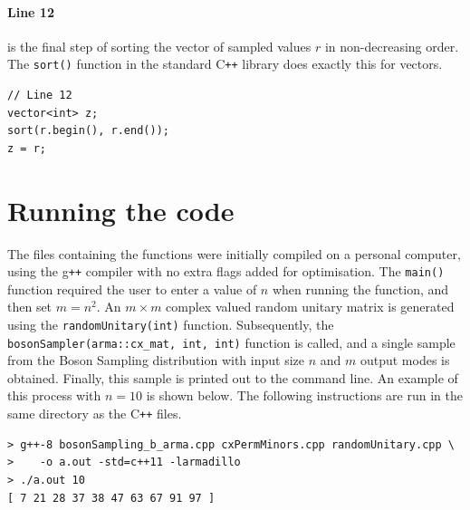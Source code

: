 \documentclass[ %
                    author={Manan Vaswani},
                supervisor={Dr. Raphael Clifford},
                    degree={MEng},
                     title={A multi-core CPU implementation of the classical Boson Sampling algorithm},
                  subtitle={},
                      type={},
                      year={2019} ]{dissertation}
\theoremstyle{plain}
\theoremstyle{definition}
\begin{document}
\paragraph{Line 12} is the final step of sorting the vector of sampled values $r$ in non-decreasing order. The \texttt{sort()} function in the standard C\texttt{++} library does exactly this for vectors.
\begin{verbatim}
// Line 12
vector<int> z;
sort(r.begin(), r.end());
z = r;
\end{verbatim}

\section{Running the code}
The files containing the functions were initially compiled on a personal computer, using the g\texttt{++} compiler with no extra flags added for optimisation. The \texttt{main()} function required the user to enter a value of $n$ when running the function, and then set $m = n^2$. An $m \times m$ complex valued random unitary matrix is generated using the \texttt{randomUnitary(int)} function. Subsequently, the \texttt{bosonSampler(arma::cx_mat, int, int)} function is called, and a single sample from the Boson Sampling distribution with input size $n$ and $m$ output modes is obtained. Finally, this sample is printed out to the command line. An example of this process with $n = 10$ is shown below. The following instructions are run in the same directory as the C\texttt{++} files.
\begin{verbatim}
> g++-8 bosonSampling_b_arma.cpp cxPermMinors.cpp randomUnitary.cpp \
>	 -o a.out -std=c++11 -larmadillo
> ./a.out 10
[ 7 21 28 37 38 47 63 67 91 97 ]
\end{verbatim}
\end{document}
